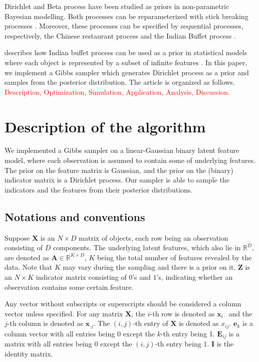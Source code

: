 \documentclass{article}
\begin{document}
Dirichlet and Beta process have been studied as priors in non-parametric Bayesian modelling. Both processes can be reparameterized with stick breaking processes \citep{broderick2012beta, paisley2011stick}. Moreover, these processes can be specified by sequential processes, respectively, the Chinese restaurant process \citep{griffiths2004hierarchical} and the Indian Buffet process \citep{thibaux2007hierarchical}. 

\citet{ghahramani2006infinite} describes how Indian buffet process can be used as a prior in statistical models where each object is represented by a subset of infinite features \citep[also see][]{griffiths2005infinite}. In this paper, we implement a Gibbs sampler which generates Dirichlet process as a prior and samples from the posterior distribution. The article is organized as follows. \textcolor{red}{Description, Optimization, Simulation, Application, Analysis, Discussion.}


\section{Description of the algorithm}

We implemented a Gibbs sampler on a linear-Gaussian binary latent feature model, where each observation is assumed to contain some of underlying features. The prior on the feature matrix is Gaussian, and the prior on the (binary) indicator matrix is a Dirichlet process. Our sampler is able to sample the indicators and the features from their posterior distributions.

\subsection{Notations and conventions}

Suppose $\mathbf{X}$ is an $N\times D$ matrix of objects, each row being an observation consisting of $D$ components. The underlying latent features, which also lie in $\mathbb{R}^D$, are denoted as $\mathbf{A} \in \mathbb{R}^{K\times D}$, $K$ being the total number of features revealed by the data. Note that $K$ may vary during the sampling and there is a prior on it. $\mathbf{Z}$ is an $N\times K$ indicator matrix consisting of $0$'s and $1$'s, indicating whether an observation contains some certain feature.

Any vector without subscripts or superscripts should be considered a column vector unless specified. For any matrix $\mathbf{X}$, the $i$-th row is denoted as $\boldsymbol{x}_{i\cdot}$ and the $j$-th column is denoted as $\boldsymbol{x}_{\cdot j}$. The $(i,j)$-th entry of $\mathbf{X}$ is denoted as $x_{ij}$. $\boldsymbol{e}_k$ is a column vector with all entries being 0 except the $k$-th entry being 1. $\mathbf{E}_{ij}$ is a matrix with all entries  being 0 except the $(i,j)$-th entry being 1. $\mathbf{I}$ is the identity matrix.
\end{document}
